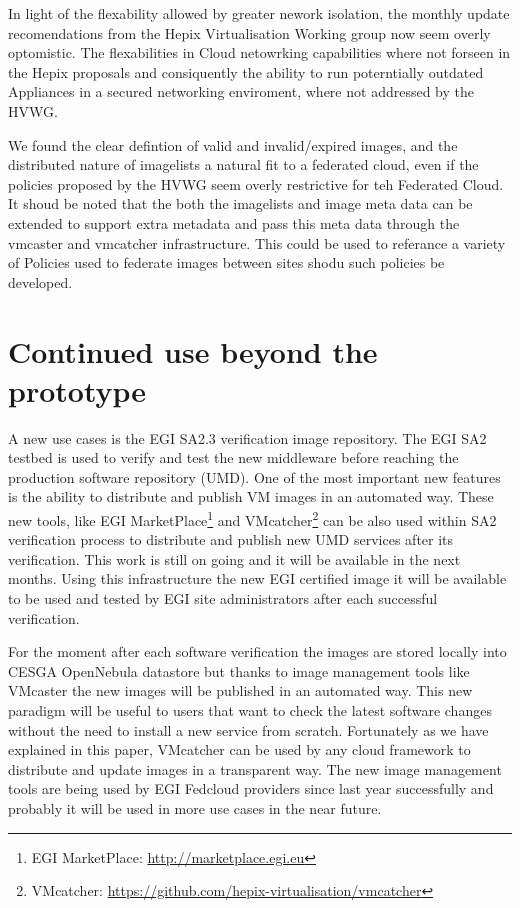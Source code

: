 \documentclass{llncs_Ibergrid2013}
\begin{document}
In light of the flexability allowed by greater nework isolation, the monthly update recomendations from the Hepix Virtualisation Working group now seem overly optomistic. The flexabilities in Cloud netowrking capabilities where not forseen in the Hepix proposals and consiquently the ability to run poterntially outdated Appliances in a secured networking enviroment, where not addressed by the HVWG.

We found the clear defintion of valid and invalid/expired images, and the distributed nature of imagelists a natural fit to a federated cloud, even if the policies proposed by the HVWG seem overly restrictive for teh Federated Cloud. It shoud be noted that the both the imagelists and image meta data can be extended to support extra metadata and pass this meta data through the vmcaster and vmcatcher infrastructure. This could be used to referance a variety of Policies used to federate images between sites shodu such policies be developed.


\section{Continued use beyond the prototype}
\label{sect-continued}

A new use cases is the EGI SA2.3 verification image repository. The EGI SA2 testbed is used to verify and test the new middleware before reaching the production software repository (UMD).
One of the most important new features is the ability to distribute and publish VM images in an automated way. 
These new tools, like EGI MarketPlace\footnote{EGI MarketPlace: \url{http://marketplace.egi.eu}} and VMcatcher\footnote{VMcatcher: \url{https://github.com/hepix-virtualisation/vmcatcher}} can be also used within SA2 verification process to distribute and publish new UMD services after its verification. 
This work is still on going and it will be available in the next months. Using this infrastructure the new EGI certified image it will be available to be used and tested by EGI site administrators after each successful verification.

For the moment after each software verification the images are stored locally into CESGA OpenNebula datastore but thanks to image management tools like VMcaster the new images will be published in an automated way.
This new paradigm will be useful to users that want to check the latest software changes without the need to install a new service from scratch.
Fortunately as we have explained in this paper, VMcatcher can be used by any cloud framework to distribute and update images in a transparent way. 
The new image management tools are being used by EGI Fedcloud providers since last year successfully and probably it will be used in more use cases in the near future.
\end{document}
